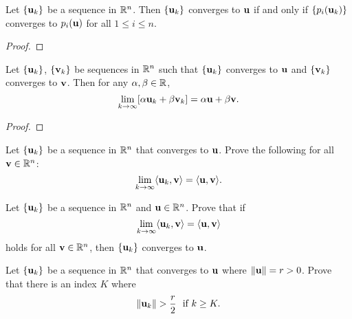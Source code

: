 \documentclass[letterpaper, twoside, 12pt]{book}
\begin{document}
\begin{theorem}
  Let \(\{\mathbf u_k\}\) be a sequence in \(\mathbb R^n\). Then
  \(\{\mathbf u_k\}\) converges to \(\mathbf u\) if and only if
  \(\{p_i(\mathbf u_k)\}\) converges to \(p_i(\mathbf u)\) for
  all \(1\leq i\leq n\).
\end{theorem}
\begin{proof}

\end{proof}

\begin{theorem}[10.10]
  Let \(\{\mathbf u_k\}\), \(\{\mathbf v_k\}\) be sequences in \(\mathbb R^n\)
  such that \(\{\mathbf u_k\}\) converges to \(\mathbf u\) and
  \(\{\mathbf v_k\}\) converges to \(\mathbf v\). Then for any
  \(\alpha,\beta\in\mathbb R\),
  \[
    \lim_{k\to\infty}[\alpha\mathbf u_k+\beta\mathbf v_k]
      =
    \alpha\mathbf u+\beta\mathbf v
  .\]
\end{theorem}
\begin{proof}

\end{proof}

\begin{exercise}[1]
  Let \(\{\mathbf u_k\}\) be a sequence in \(\mathbb R^n\) that converges to
  \(\mathbf u\). Prove the following for all \(\mathbf v\in\mathbb R^n\):
  \[
    \lim_{k\to\infty}\langle\mathbf u_k,\mathbf v\rangle=\langle\mathbf u,\mathbf v\rangle
  .\]
\end{exercise}
\begin{solution}

\end{solution}

\begin{exercise}[2]
  Let \(\{\mathbf u_k\}\) be a sequence in \(\mathbb R^n\) and
  \(\mathbf u\in\mathbb R^n\). Prove that if
  \[
    \lim_{k\to\infty}\langle\mathbf u_k,\mathbf v\rangle=\langle\mathbf u,\mathbf v\rangle
  \]
  holds for all \(\mathbf v\in\mathbb R^n\), then \(\{\mathbf u_k\}\) converges
  to \(\mathbf u\).
\end{exercise}
\begin{solution}

\end{solution}

\begin{exercise}[5]
  Let \(\{\mathbf u_k\}\) be a sequence in \(\mathbb R^n\) that converges to
  \(\mathbf u\) where \(\|\mathbf u\|=r>0\). Prove that there is an index \(K\)
  where
  \[
    \|\vect u_k\|>\frac{r}{2}
    \text{~~if~}
    k\geq K
  .\]
\end{exercise}
\begin{solution}

\end{solution}
\end{document}
